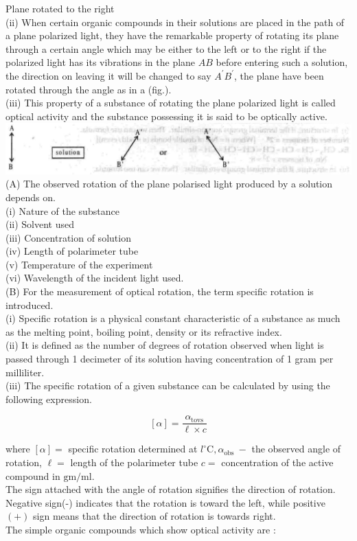 \documentclass[10pt]{article}
\begin{document}
Plane rotated to the right\\
(ii) When certain organic compounds in their solutions are placed in the path of a plane polarized light, they have the remarkable property of rotating its plane through a certain angle which may be either to the left or to the right if the polarized light has its vibrations in the plane $A B$ before entering such a solution, the direction on leaving it will be changed to say $A^{\prime} B^{\prime}$, the plane have been rotated through the angle as in a (fig.).\\
(iii) This property of a substance of rotating the plane polarized light is called optical activity and the substance possessing it is said to be optically active.\\
\includegraphics[max width=\textwidth, center]{2025_01_28_8470952b98110cec3aabg-048(8)}\\
(A) The observed rotation of the plane polarised light produced by a solution depends on.\\
(i) Nature of the substance\\
(ii) Solvent used\\
(iii) Concentration of solution\\
(iv) Length of polarimeter tube\\
(v) Temperature of the experiment\\
(vi) Wavelength of the incident light used.\\
(B) For the measurement of optical rotation, the term specific rotation is introduced.\\
(i) Specific rotation is a physical constant characteristic of a substance as much as the melting point, boiling point, density or its refractive index.\\
(ii) It is defined as the number of degrees of rotation observed when light is passed through 1 decimeter of its solution having concentration of 1 gram per milliliter.\\
(iii) The specific rotation of a given substance can be calculated by using the following expression.

$$
[\alpha]=\frac{\alpha_{\mathrm{tovs}}}{\ell \times c}
$$

where $[\alpha]=$ specific rotation determined at $l^{\circ} \mathrm{C}, \alpha_{\text {obs }}-$ the observed angle of rotation, $\ell=$ length of the polarimeter tube $c=$ concentration of the active compound in $\mathrm{gm} / \mathrm{ml}$.\\
The sign attached with the angle of rotation signifies the direction of rotation. Negative sign(-) indicates that the rotation is toward the left, while positive $(+)$ sign means that the direction of rotation is towards right.\\
The simple organic compounds which show optical activity are :
\end{document}
